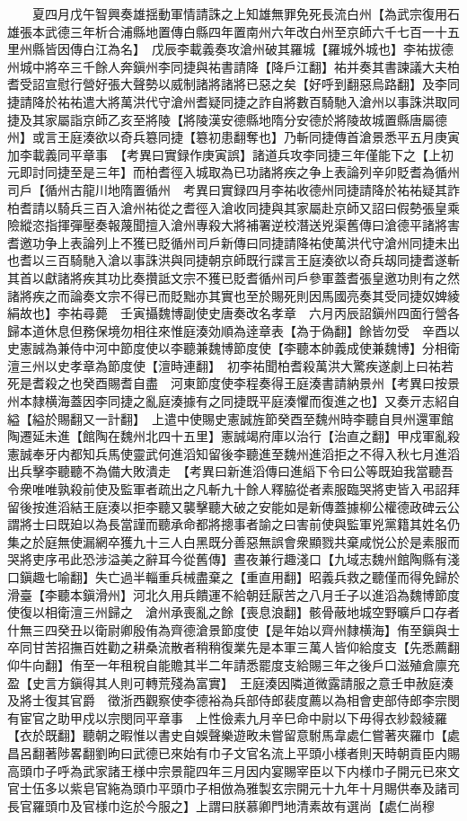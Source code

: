 　　夏四月戊午智興奏雄揺動軍情請誅之上知雄無罪免死長流白州【為武宗復用石雄張本武德三年析合浦縣地置傳白縣四年置南州六年改白州至京師六千七百一十五里州縣皆因傳白江為名】　戊辰李載義奏攻滄州破其羅城【羅城外城也】李祐拔德州城中將卒三千餘人奔鎭州李同捷與祐書請降【降戶江翻】祐并奏其書諫議大夫柏耆受詔宣慰行營好張大聲勢以威制諸將諸將已惡之矣【好呼到翻惡烏路翻】及李同捷請降於祐祐遣大將萬洪代守滄州耆疑同捷之詐自將數百騎馳入滄州以事誅洪取同捷及其家屬詣京師乙亥至將陵【將陵漢安德縣地隋分安德於將陵故城置縣唐屬德州】或言王庭湊欲以奇兵簒同捷【簒初患翻奪也】乃斬同捷傳首滄景悉平五月庚寅加李載義同平章事　【考異曰實録作庚寅誤】諸道兵攻李同捷三年僅能下之【上初元即討同捷至是三年】而柏耆徑入城取為已功諸將疾之争上表論列辛卯貶耆為循州司戶【循州古龍川地隋置循州　考異曰實録四月李祐收德州同捷請降於祐祐疑其詐柏耆請以騎兵三百入滄州祐從之耆徑入滄收同捷與其家屬赴京師又詔曰假勢張皇乘險縱恣指揮彈壓奏報蔑聞擅入滄州專殺大將補署逆校潛送兇渠舊傳曰滄德平諸將害耆邀功争上表論列上不獲已貶循州司戶新傳曰同捷請降祐使萬洪代守滄州同捷未出也耆以三百騎馳入滄以事誅洪與同捷朝京師既行諜言王庭湊欲以奇兵刼同捷耆遂斬其首以獻諸將疾其功比奏攢詆文宗不獲已貶耆循州司戶參軍蓋耆張皇邀功則有之然諸將疾之而論奏文宗不得已而貶黜亦其實也至於賜死則因馬國亮奏其受同捷奴婢綾絹故也】李祐尋薨　壬寅攝魏博副使史唐奏改名孝章　六月丙辰詔鎭州四面行營各歸本道休息但務保境勿相往來惟庭湊効順為逹章表【為于偽翻】餘皆勿受　辛酉以史憲誠為兼侍中河中節度使以李聽兼魏博節度使【李聽本帥義成使兼魏博】分相衛澶三州以史孝章為節度使【澶時連翻】　初李祐聞柏耆殺萬洪大驚疾遂劇上曰祐若死是耆殺之也癸酉賜耆自盡　河東節度使李程奏得王庭湊書請納景州【考異曰按景州本隸横海蓋因李同捷之亂庭湊據有之同捷既平庭湊懼而復進之也】又奏亓志紹自縊【縊於賜翻又一計翻】　上遣中使賜史憲誠旌節癸酉至魏州時李聽自貝州還軍館陶遷延未進【館陶在魏州北四十五里】憲誠竭府庫以治行【治直之翻】甲戍軍亂殺憲誠奉牙内都知兵馬使靈武何進滔知留後李聽進至魏州進滔拒之不得入秋七月進滔出兵擊李聽聽不為備大敗潰走　【考異曰新進滔傳曰進縚下令曰公等既廹我當聽吾令衆唯唯孰殺前使及監軍者疏出之凡斬九十餘人釋脇從者素服臨哭將吏皆入弔詔拜留後按進滔結王庭湊以拒李聽又襲擊聽大破之安能如是新傳蓋據柳公權德政碑云公謂將士曰既廹以為長當謹而聽承命都將摠事者諭之曰害前使與監軍兇黨籍其姓名仍集之於庭無使漏網卒獲九十三人白黑既分善惡無誤會衆顯戮共棄咸悦公於是素服而哭將吏序弔此恐涉溢美之辭耳今從舊傳】晝夜兼行趣淺口【九域志魏州館陶縣有淺口鎭趣七喻翻】失亡過半輜重兵械盡棄之【重直用翻】昭義兵救之聽僅而得免歸於滑臺【李聽本鎭滑州】河北久用兵饋運不給朝廷厭苦之八月壬子以進滔為魏博節度使復以相衛澶三州歸之　滄州承喪亂之餘【喪息浪翻】骸骨蔽地城空野曠戶口存者什無三四癸丑以衛尉卿殷侑為齊德滄景節度使【是年始以齊州隸横海】侑至鎭與士卒同甘苦招撫百姓勸之耕桑流散者稍稍復業先是本軍三萬人皆仰給度支【先悉薦翻仰牛向翻】侑至一年租稅自能贍其半二年請悉罷度支給賜三年之後戶口滋殖倉廪充盈【史言方鎭得其人則可轉荒殘為富實】　王庭湊因隣道微露請服之意壬申赦庭湊及將士復其官爵　徵浙西觀察使李德裕為兵部侍郎裴度薦以為相會吏部侍郎李宗閔有宦官之助甲戍以宗閔同平章事　上性儉素九月辛巳命中尉以下毋得衣紗縠綾羅【衣於既翻】聽朝之暇惟以書史自娛聲樂遊畋未嘗留意駙馬韋處仁嘗著夾羅巾【處昌呂翻著陟畧翻劉昫曰武德已來始有巾子文官名流上平頭小様者則天時朝貢臣内賜高頭巾子呼為武家諸王様中宗景龍四年三月因内宴賜宰臣以下内様巾子開元已來文官士伍多以紫皂官絁為頭巾平頭巾子相倣為雅製玄宗開元十九年十月賜供奉及諸司長官羅頭巾及官様巾迄於今服之】上謂曰朕慕卿門地清素故有選尚【處仁尚穆